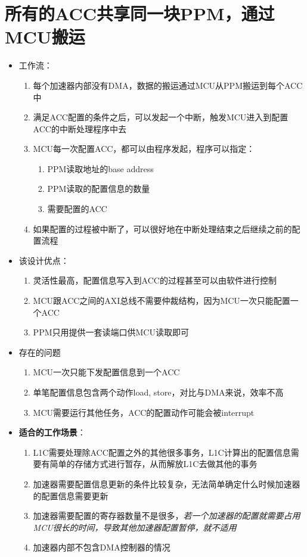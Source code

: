 \documentclass[a4paper, 12pt]{article}
\begin{document}
\section{所有的ACC共享同一块PPM，通过MCU搬运}%
\begin{itemize}
  \item 工作流：
    \begin{enumerate}
      \item 每个加速器内部没有DMA，数据的搬运通过MCU从PPM搬运到每个ACC中
      \item 满足ACC配置的条件之后，可以发起一个中断，触发MCU进入到配置ACC的中断处理程序中去
      \item MCU每一次配置ACC，都可以由程序发起，程序可以指定：
        \begin{enumerate}
          \item PPM读取地址的base address
          \item PPM读取的配置信息的数量
          \item 需要配置的ACC
        \end{enumerate}
      \item 如果配置的过程被中断了，可以很好地在中断处理结束之后继续之前的配置流程
    \end{enumerate}
  \item 该设计优点：
    \begin{enumerate}
      \item 灵活性最高，配置信息写入到ACC的过程甚至可以由软件进行控制
      \item MCU跟ACC之间的AXI总线不需要仲裁结构，因为MCU一次只能配置一个ACC
      \item PPM只用提供一套读端口供MCU读取即可
    \end{enumerate}
  \item 存在的问题
    \begin{enumerate}
      \item MCU一次只能下发配置信息到一个ACC
      \item 单笔配置信息包含两个动作load, store，对比与DMA来说，效率不高
      \item MCU需要运行其他任务，ACC的配置动作可能会被interrupt
    \end{enumerate}
  \item \textbf{适合的工作场景}：
    \begin{enumerate}
      \item L1C需要处理除ACC配置之外的其他很多事务，L1C计算出的配置信息需要有简单的存储方式进行暂存，从而解放L1C去做其他的事务
      \item 加速器需要配置信息更新的条件比较复杂，无法简单确定什么时候加速器的配置信息需要更新
      \item 加速器需要配置的寄存器数量不是很多，\textit{若一个加速器的配置就需要占用MCU很长的时间，导致其他加速器配置暂停，就不适用}
      \item 加速器内部不包含DMA控制器的情况
    \end{enumerate}
\end{itemize}
  
\end{document}
